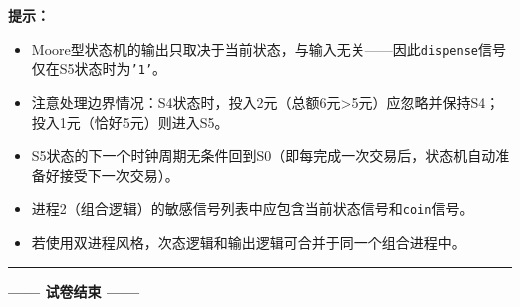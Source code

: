 \begin{framed}
\textbf{提示：}
\begin{itemize}
  \item Moore型状态机的输出只取决于当前状态，与输入无关——因此\texttt{dispense}信号仅在S5状态时为\texttt{'1'}。
  \item 注意处理边界情况：S4状态时，投入2元（总额6元>5元）应忽略并保持S4；投入1元（恰好5元）则进入S5。
  \item S5状态的下一个时钟周期无条件回到S0（即每完成一次交易后，状态机自动准备好接受下一次交易）。
  \item 进程2（组合逻辑）的敏感信号列表中应包含当前状态信号和\texttt{coin}信号。
  \item 若使用双进程风格，次态逻辑和输出逻辑可合并于同一个组合进程中。
\end{itemize}
\end{framed}

\vspace{0.5cm}
{\centering
\rule{0.8\textwidth}{0.5pt}
\vspace{0.3cm}

\textbf{—— 试卷结束 ——}

\vspace{0.5cm}}

\endinput
